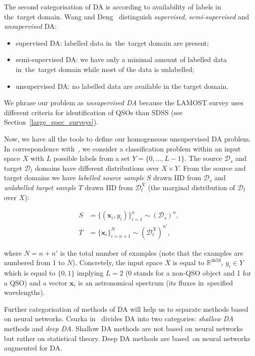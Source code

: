 The second categorisation of DA is according to availability of labels in the~target domain.
Wang and Deng~\cite{wang2018} distinguish \textit{supervised}, \textit{semi-supervised} and \textit{unsupervised} DA:

\begin{itemize}
	\item supervised DA: labelled data in~the~target domain are present;
	\item semi-supervised DA: we have only a minimal amount of labelled data in~the~target domain while most of the data is unlabelled;
	\item unsupervised DA: no labelled data are available in the target domain.
\end{itemize}

We phrase our problem as \textit{unsupervised DA}
because the LAMOST survey uses different criteria for identification of QSOs than SDSS
(see Section~\ref{large_spec_surveys}).

Now, we have all the tools to define our homogeneous unsupervised DA problem.
In correspondence with~\cite{ganin2016},
we consider a classification problem within an input space \(X\)
with \(L\) possible labels from a set \(Y = \{0, \dots, L - 1\}\).
The source \(\mathcal{D}_s\) and target \(\mathcal{D}_t\) domains
have different distributions over \(X \times Y\).
From the source and target domains
we have \textit{labelled source sample} \(S\) drawn IID from \(\mathcal{D}_s\)
and \textit{unlabelled target sample} \(T\) drawn IID from \(\mathcal{D}^X_t\) 
(the marginal distribution of \(\mathcal{D}_t\) over \(X\)):

\begin{align}
	S &= \{(\mathbf{x}_i, y_i)\}^n_{i = 1} \sim (\mathcal{D}_s)^n, \\
	T &= \{\mathbf{x}_i\}^N_{i = n + 1} \sim (\mathcal{D}^X_t)^{n'},
\end{align}

where \(N = n + n'\) is the total number of examples
(note that the examples are numbered from 1 to \(N\)).
Concretely, the input space \(X\) is equal to \(\mathbb{R}^{3659}\),
\(y_i \in Y\) which is equal to \(\{0, 1\}\) implying \(L = 2\)
(0 stands for a non-QSO object and 1 for a QSO)
and a vector \(\mathbf{x}_i\) is an astronomical spectrum
(its fluxes in~specified wavelengths).

Further categorisation of methods of DA will help us to separate methods based on neural networks.
Csurka in~\cite{csurka2017} divides DA into two categories:
\textit{shallow DA} methods and \textit{deep DA}.
Shallow DA methods are not based on neural networks but rather on statistical theory.
Deep DA methods are based~on neural networks augmented for DA.

